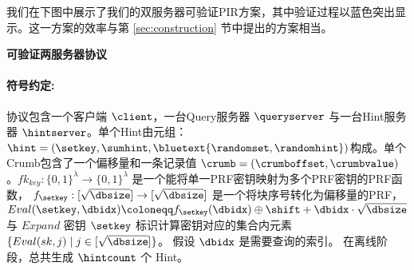 我们在下图中展示了我们的双服务器可验证PIR方案，其中验证过程以蓝色突出显示。这一方案的效率与第 \ref{sec:construction} 节中提出的方案相当。

    \begin{mdframed}
        \centering
        \textbf{可验证两服务器协议}

        \raggedright
        \paragraph{符号约定:} 协议包含一个客户端 $\client$，一台Query服务器 $\queryserver$ 与一台Hint服务器 $\hintserver$。单个Hint由元组：$\hint=(\setkey,\sumhint,\bluetext{\randomset,\randomhint})$构成。单个Crumb包含了一个偏移量和一条记录值 $\crumb=(\crumboffset,\crumbvalue)$。$fk_{key}:\{0,1\}^\lambda \to \{0,1\}^\lambda$ 是一个能将单一PRF密钥映射为多个PRF密钥的PRF函数， $f_{\setkey}: [\sqrt{\dbsize}]\to [\sqrt{\dbsize}]$ 是一个将块序号转化为偏移量的PRF，  $Eval(\setkey,\dbidx) \coloneqq f_{\setkey}(\dbidx)\oplus \shift + \dbidx\cdot\sqrt{\dbsize}$ 与 $Expand$ 密钥 $\setkey$ 标识计算密钥对应的集合内元素 $\{Eval(sk,j) \mid j\in[\sqrt{\dbsize}]\}$。  假设 $\dbidx$ 是需要查询的索引。 在离线阶段，总共生成 $\hintcount$ 个 Hint。


\end{mdframed}
